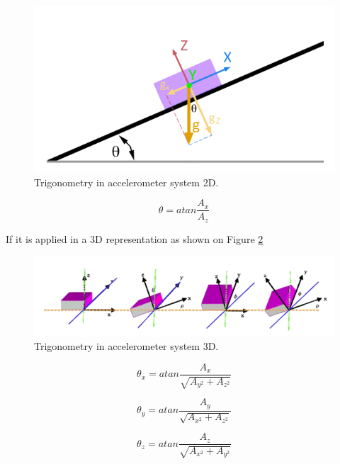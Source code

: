 \begin{figure}[H]
	\center
	\includegraphics[scale=0.4]{imagenes/Balancing_robot/acelerometro1}
	\caption{Trigonometry in accelerometer system 2D.}
	\label{fig:acelerometro1}
\end{figure}

\begin{equation}
\theta = atan\frac{A_{x}}{A_{z}}
\end{equation}

If it is applied in a 3D representation as shown on Figure \ref{fig:acelerometro2}

\begin{figure}[H]
	\center
	\includegraphics[scale=0.6]{imagenes/Balancing_robot/acelerometro2}
	\caption{Trigonometry in accelerometer system 3D.}
	\label{fig:acelerometro2}
\end{figure}

\begin{equation}
\theta_{x} = atan\frac{A_{x}}{\sqrt{A_{y^2}+A_{z^2}}}
\end{equation}

\begin{equation}
\theta_{y} = atan\frac{A_{y}}{\sqrt{A_{x^2}+A_{z^2}}}
\end{equation}

\begin{equation}
\theta_{z} = atan\frac{A_{z}}{\sqrt{A_{x^2}+A_{y^2}}}
\end{equation}

